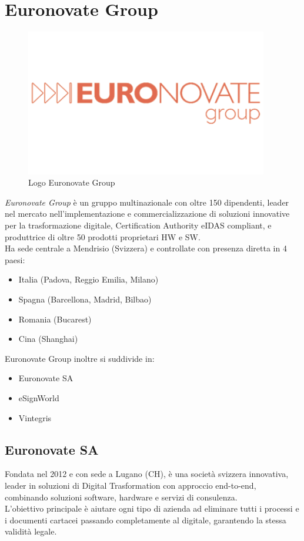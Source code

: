 \section{Euronovate Group}
\begin{figure}[!h] 
    \centering 
    \includegraphics[width=300pt]{images/euronovateGroupLogo.png} 
    \caption{Logo Euronovate Group}
    \label{fig:euronovateLogo}
\end{figure}
\emph{Euronovate Group} è un gruppo multinazionale con oltre 150 dipendenti, leader nel mercato
nell'implementazione e commercializzazione di soluzioni innovative per la trasformazione digitale,
Certification Authority eIDAS compliant, e produttrice di oltre 50 prodotti proprietari HW e
SW.\\
Ha sede centrale a Mendrisio (Svizzera) e controllate con presenza diretta in 4 paesi:
\begin{itemize}
    \item Italia (Padova, Reggio Emilia, Milano)
    \item Spagna (Barcellona, Madrid, Bilbao)
    \item Romania (Bucarest)
    \item Cina (Shanghai)
\end{itemize}
Euronovate Group inoltre si suddivide in:
\begin{itemize}
    \item Euronovate SA
    \item eSignWorld
    \item Vintegris
\end{itemize}

\subsection{Euronovate SA}
Fondata nel 2012 e con sede a Lugano (CH), è una società svizzera innovativa, leader in soluzioni
di Digital Trasformation con approccio end-to-end, combinando soluzioni software, hardware
e servizi di consulenza.\\
L'obiettivo principale è aiutare ogni tipo di azienda ad eliminare tutti i processi e i documenti
cartacei passando completamente al digitale, garantendo la stessa validità legale.

